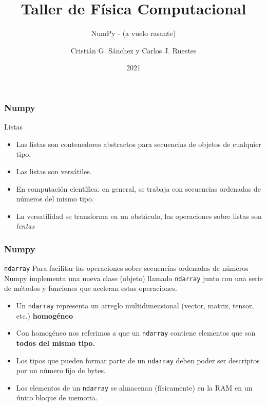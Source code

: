 \documentclass{beamer}
\title{Taller de Física Computacional}
\subtitle{NumPy - (a vuelo rasante)}
\author{Cristián G. Sánchez y Carlos J. Ruestes}
\date{2021}
\begin{document}
\frame{\titlepage}

\begin{frame}[fragile]
    \frametitle{Numpy}
 
    \begin{block}{Listas}
        \begin{itemize}
            \item Las listas son contenedores abstractos para secuencias de objetos de cualquier tipo.
            \item Las listas son versátiles.
            \item En computación científica, en general, se trabaja con secuencias ordenadas de números del mismo tipo.
            \item La versatilidad se transforma en un obstáculo, las operaciones sobre listas son {\em lentas} 
        \end{itemize}
    \end{block}

    \end{frame}

\begin{frame}[fragile]
    \frametitle{Numpy}
 
    \begin{block}{{\tt ndarray}}
        Para facilitar las operaciones sobre secuencias ordenadas de números Numpy implementa una nueva clase
        (objeto) llamado {\tt ndarray} junto con una serie de métodos y funciones que aceleran estas operaciones.
        \begin{itemize}
            \item Un {\tt ndarray} representa un arreglo multidimensional (vector, matriz, tensor, etc.)
            {\bf homogéneo}
            \item Con homogéneo nos referimos a que un {\tt ndarray} contiene elementos que son {\bf todos del mismo tipo.}
            \item Los tipos que pueden formar parte de un {\tt ndarray} deben poder ser descriptos por un número fijo de bytes.
            \item Los elementos de un {\tt ndarray} se almacenan (físicamente) en la RAM en un único bloque de memoria.
        \end{itemize}
    \end{block}

    \end{frame}
\end{document}
